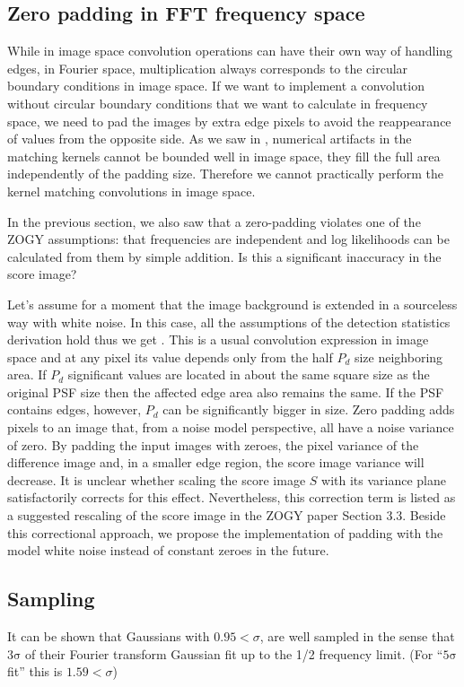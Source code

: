 \documentclass[11pt]{article}
\begin{document}
\subsection{Zero padding in FFT frequency space\label{sec:zeropadS}}
%
\par While in image space convolution operations can have their own
way of handling edges, in Fourier space, multiplication always
corresponds to the circular boundary conditions in image space.  If we
want to implement a convolution without circular boundary
conditions that we want to calculate in frequency space,
we need to pad the images by extra edge pixels to avoid the
reappearance of values from the opposite side.
As we saw in , numerical artifacts in the matching
kernels cannot be bounded well in image space, they fill the full area
independently of the padding size. Therefore we cannot practically perform
the kernel matching convolutions in image space.
%
\par In the previous section, we also saw that a zero-padding violates one
of the ZOGY assumptions: that frequencies are independent and log
likelihoods can be calculated from them by simple addition. Is this a
significant inaccuracy in the score image?
%
\par Let's assume for a moment that the image background is extended in a
sourceless way with white noise. In this case, all the assumptions of the
detection statistics derivation hold thus we get . This is a
usual convolution expression in image space and at any pixel its value
depends only from the half \(P_d\) size neighboring area. If \(P_d\)
significant values are located in about the same square size as the original
PSF size then the affected edge area also remains the same. If the PSF
contains edges, however, \(P_d\) can be significantly bigger in size. Zero
padding adds pixels to an image that, from a noise model perspective, all
have a noise variance of zero. By padding the input images with zeroes, the
pixel variance of the difference image and, in a smaller edge region, the
score image variance will decrease. It is unclear whether scaling the score
image \(S\) with its variance plane satisfactorily corrects for this
effect. Nevertheless, this correction term is listed as a suggested
rescaling of the score image in the ZOGY paper Section 3.3. Beside this
correctional approach, we propose the implementation of padding with the
model white noise instead of constant zeroes in the future.
%
\subsection{Sampling}
\par It can be shown that Gaussians with \(0.95 < \sigma\), are well
sampled in the sense that \(\mathrm{3\sigma}\) of their Fourier
transform Gaussian fit up to the 1/2 frequency limit. (For
``\(\mathrm{5\sigma}\) fit'' this is \(1.59 < \sigma\))
%
\end{document}
